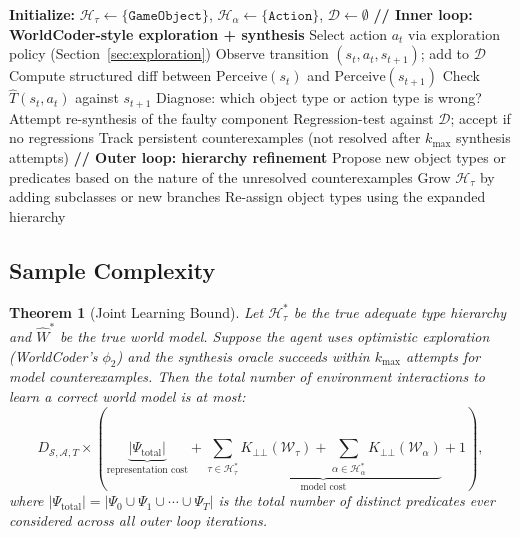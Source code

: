 \documentclass{article}
\newtheorem{theorem}{Theorem}
\newcommand{\calS}{\mathcal{S}}
\newcommand{\calA}{\mathcal{A}}
\newcommand{\calD}{\mathcal{D}}
\newcommand{\calH}{\mathcal{H}}
\newcommand{\calW}{\mathcal{W}}
\begin{document}
\begin{algorithm}[h]
\caption{OOP World Model Learning}
\label{alg:main}
\begin{algorithmic}[1]
\STATE \textbf{Initialize:} $\calH_\tau \leftarrow \{\texttt{GameObject}\}$,
       $\calH_\alpha \leftarrow \{\texttt{Action}\}$, $\calD \leftarrow \emptyset$
\REPEAT
    \STATE \textbf{// Inner loop: WorldCoder-style exploration + synthesis}
    \REPEAT
        \STATE Select action $a_t$ via exploration policy (Section~\ref{sec:exploration})
        \STATE Observe transition $(s_t, a_t, s_{t+1})$;
               add to $\calD$
        \STATE Compute structured diff between
               $\text{Perceive}(s_t)$ and $\text{Perceive}(s_{t+1})$
        \STATE Check $\hat{T}(s_t, a_t)$ against $s_{t+1}$
            \STATE Diagnose: which object type or action type is wrong?
            \STATE Attempt re-synthesis of the faulty component
            \STATE Regression-test against $\calD$; accept if no regressions
        \ENDIF
        \STATE Track persistent counterexamples (not resolved after
               $k_{\max}$ synthesis attempts)
    \STATE \textbf{// Outer loop: hierarchy refinement}
        \STATE Propose new object types or predicates based on the nature of
               the unresolved counterexamples
        \STATE Grow $\calH_\tau$ by adding subclasses or new branches
        \STATE Re-assign object types using the expanded hierarchy
    \ENDIF
\UNTIL{model is correct on all of $\calD$}
\end{algorithmic}
\end{algorithm}

\subsection{Sample Complexity}
\label{sec:sample_complexity}

\begin{theorem}[Joint Learning Bound]
\label{thm:joint}
Let $\calH_\tau^*$ be the true adequate type hierarchy and $\hat{W}^*$ be
the true world model.  Suppose the agent uses optimistic exploration
(WorldCoder's $\phi_2$) and the synthesis oracle succeeds within $k_{\max}$
attempts for model counterexamples.  Then the total number of environment
interactions to learn a correct world model is at most:
\begin{equation}
D_{\calS,\calA,T} \times \left(
    \underbrace{|\Psi_{\text{total}}|}_{\text{representation cost}}
    + \underbrace{\sum_{\tau \in \calH_\tau^*}
    K_{\bot\!\!\bot}(\calW_\tau)
    + \sum_{\alpha \in \calH_\alpha^*}
    K_{\bot\!\!\bot}(\calW_\alpha)}_{\text{model cost}}
    + 1
\right),
\end{equation}
where $|\Psi_{\text{total}}| = |\Psi_0 \cup \Psi_1 \cup \cdots \cup \Psi_T|$
is the total number of distinct predicates ever considered across all outer
loop iterations.
\end{theorem}
\end{document}
